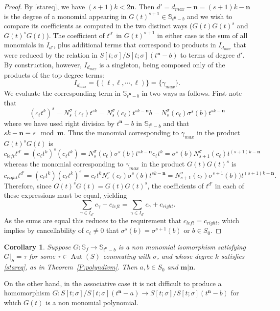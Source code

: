 \documentclass[11pt]{amsart}
\theoremstyle{plain}
\newtheorem{corollary}[theorem]{Corollary}
\theoremstyle{definition}
\numberwithin{equation}{section}
\numberwithin{figure}{section}
\newcommand{\Sone}[1]{\Stsigma/\Stsigma (t^{\de}-#1)} %
\newcommand{\ring}{S}
\newcommand{\Stsigma}{S[t;\sigma]}
\newcommand{\os}{\mathbf{m}}  %
\newcommand{\de}{\mathbf{n}}  %
\DeclareMathOperator{\Aut}{Aut}
\begin{document}
\begin{proof}
By \eqref{stareq}, we have $(s+1)k<2\de$.  Then $d'=d_{max}-\de=(s+1)k-\de$ is the degree of a monomial appearing in $G(t)^{s+1}\in \mathbb{S}_{t^\de-b} %
$ and we wish to compare its coefficients as computed in the two distinct ways ($G(t)G(t)^s$ and $G(t)^sG(t)$).  The coefficient of $t^{d'}$ in $G(t)^{s+1}$ in either case is the sum of all monomials in $I_{d'}$, plus additional terms that correspond to products in $I_{d_{max}}$ that were reduced by the relation in $\Sone{b}$ to terms of degree $d'$.  By construction, however, $I_{d_{max}}$ is a singleton, being composed only of the products of the top degree terms:
$$
I_{d_{max}} = \{ (\ell,\ell,\cdots,\ell) \} = \{\gamma_{max}\}.
$$
We evaluate the corresponding term in $\mathbb{S}_{t^\de-b}$ 
in two ways as follows.
First note that
$$
(c_\ell t^{k})^s = N_{s}^\sigma(c_\ell)t^{sk}= N_{s}^\sigma(c_\ell)t^{sk-\de}b=N_{s}^\sigma(c_\ell)\sigma^{s}(b)t^{sk-\de}
$$
where we have used right division by $t^{\de}-b$ in $\mathbb{S}_{t^\de-b}$
and that $sk-\de\equiv s\mod \os$.
Thus the monomial corresponding to $\gamma_{max}$ in the product $G(t)^sG(t)$ is
$$
c_{left}t^{d'}=(c_\ell t^{k})^s(c_\ell t^{k}) = N_{s}^\sigma(c_\ell)\sigma^{s}(b)t^{sk-\de}c_\ell t^{k}=
\sigma^s(b)N_{s+1}^\sigma(c_\ell)t^{(s+1)k-\de}
$$
whereas the monomial corresponding to $\gamma_{max}$ in the product $G(t)G(t)^s$ is
$$
c_{right}t^{d'}=(c_\ell t^{k})(c_\ell t^{k})^s=c_\ell t^{k}N_{s}^\sigma(c_\ell)\sigma^{s}(b)t^{sk-\de}=
N_{s+1}^\sigma(c_\ell)\sigma^{s+1}(b))t^{(s+1)k-\de}.
$$
Therefore, since $G(t)^sG(t)=G(t)G(t)^s$, the coefficients of $t^{d'}$ in each of these expressions must be equal, yielding
$$
 \sum_{\gamma \in I_{d'}}c_\gamma + c_{left}=\sum_{\gamma \in I_{d'}}c_\gamma+c_{right}.
 $$
As the sums are equal this reduces to the requirement that $c_{left}=c_{right}$, which implies by cancellability of $c_\ell\neq 0$ that $\sigma^s(b)=\sigma^{s+1}(b)$ or $b\in \ring_0$.
\end{proof}


\begin{corollary}
    \label{c:main}
    Suppose $G: \mathbb{S}_{f}\to \mathbb{S}_{t^\de-b} $ is a non monomial isomorphism satisfying $G|_{\ring}=\tau$ for some $\tau\in \Aut(\ring)$ commuting with $\sigma$, and whose degree $k$ satisfies \eqref{stareq}, as in Theorem~\ref{P:polyndivm}.
    Then  $a,b\in \ring_0$ and $\os|\de$.
\end{corollary}


On the other hand, in the associative case it is not difficult to produce a homomorphism $G: \Sone{a}\to \Sone{b}$ for which $G(t)$ is a non monomial polynomial.
\end{document}
